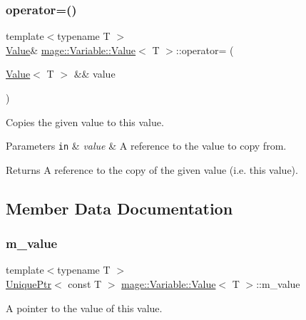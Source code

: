 \subsubsection{\texorpdfstring{operator=()}{operator=()}\hspace{0.1cm}{\footnotesize\ttfamily [2/2]}}
{\footnotesize\ttfamily template$<$typename T $>$ \\
\hyperlink{structmage_1_1_variable_1_1_value}{Value}\& \hyperlink{structmage_1_1_variable_1_1_value}{mage\+::\+Variable\+::\+Value}$<$ T $>$\+::operator= (\begin{DoxyParamCaption}\item[{\hyperlink{structmage_1_1_variable_1_1_value}{Value}$<$ T $>$ \&\&}]{value }\end{DoxyParamCaption})\hspace{0.3cm}{\ttfamily [delete]}}

Copies the given value to this value.


\begin{DoxyParams}[1]{Parameters}
\mbox{\tt in}  & {\em value} & A reference to the value to copy from. \\
\hline
\end{DoxyParams}
\begin{DoxyReturn}{Returns}
A reference to the copy of the given value (i.\+e. this value). 
\end{DoxyReturn}


\subsection{Member Data Documentation}
\hypertarget{structmage_1_1_variable_1_1_value_ae034b2263375fdcfdba4f0cfdb3cd014}{}\label{structmage_1_1_variable_1_1_value_ae034b2263375fdcfdba4f0cfdb3cd014} 
\subsubsection{\texorpdfstring{m\+\_\+value}{m\_value}}
{\footnotesize\ttfamily template$<$typename T $>$ \\
\hyperlink{namespacemage_a8c307fbcc33bce9b7f2aa4c26c3b95cf}{Unique\+Ptr}$<$ const T $>$ \hyperlink{structmage_1_1_variable_1_1_value}{mage\+::\+Variable\+::\+Value}$<$ T $>$\+::m\+\_\+value\hspace{0.3cm}{\ttfamily [private]}}

A pointer to the value of this value. 